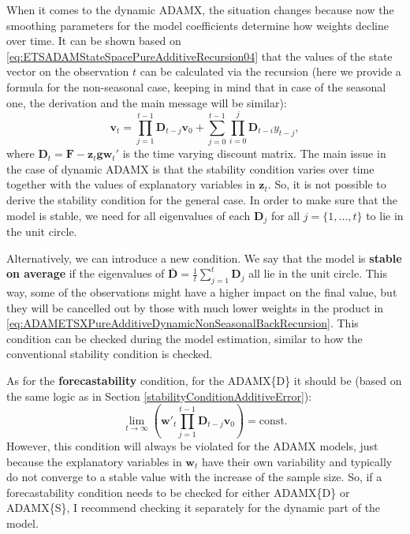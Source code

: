 \documentclass[
]{book}
\theoremstyle{definition}
\theoremstyle{definition}
\theoremstyle{definition}
\theoremstyle{definition}
\theoremstyle{remark}
\begin{document}
When it comes to the dynamic ADAMX, the situation changes because now the smoothing parameters for the model coefficients determine how weights decline over time. It can be shown based on \eqref{eq:ETSADAMStateSpacePureAdditiveRecursion04} that the values of the state vector on the observation \(t\) can be calculated via the recursion (here we provide a formula for the non-seasonal case, keeping in mind that in case of the seasonal one, the derivation and the main message will be similar):
\begin{equation}
  \mathbf{v}_{t} = \prod_{j=1}^{t-1}\mathbf{D}_{t-j} \mathbf{v}_{0} + \sum_{j=0}^{t-1} \prod_{i=0}^{j} \mathbf{D}_{t-i} y_{t-j},
  \label{eq:ADAMETSXPureAdditiveDynamicNonSeasonalBackRecursion}
\end{equation}
where \(\mathbf{D}_t=\mathbf{F} -\mathbf{z}_t \mathbf{g} \mathbf{w}_{t}'\) is the time varying discount matrix. The main issue in the case of dynamic ADAMX is that the stability condition varies over time together with the values of explanatory variables in \(\mathbf{z}_t\). So, it is not possible to derive the stability condition for the general case. In order to make sure that the model is stable, we need for all eigenvalues of each \(\mathbf{D}_{j}\) for all \(j=\{1,\dots,t\}\) to lie in the unit circle.

Alternatively, we can introduce a new condition. We say that the model is \textbf{stable on average} if the eigenvalues of \(\mathbf{\bar{D}}=\frac{1}{t}\sum_{j=1}^t\mathbf{D}_j\) all lie in the unit circle. This way, some of the observations might have a higher impact on the final value, but they will be cancelled out by those with much lower weights in the product in \eqref{eq:ADAMETSXPureAdditiveDynamicNonSeasonalBackRecursion}. This condition can be checked during the model estimation, similar to how the conventional stability condition is checked.

As for the \textbf{forecastability} condition, for the ADAMX\{D\} it should be (based on the same logic as in Section \ref{stabilityConditionAdditiveError}):
\begin{equation}
  \lim\limits_{t\rightarrow\infty}\left(\mathbf{w}'_{t}\prod_{j=1}^{t-1}\mathbf{D}_{t-j} \mathbf{v}_{0}\right) = \text{const} .
  \label{eq:ADAMETSXPureAdditiveDynamicNonSeasonalBackForecastability}
\end{equation}
However, this condition will always be violated for the ADAMX models, just because the explanatory variables in \(\mathbf{w}_{t}\) have their own variability and typically do not converge to a stable value with the increase of the sample size. So, if a forecastability condition needs to be checked for either ADAMX\{D\} or ADAMX\{S\}, I recommend checking it separately for the dynamic part of the model.
\end{document}

